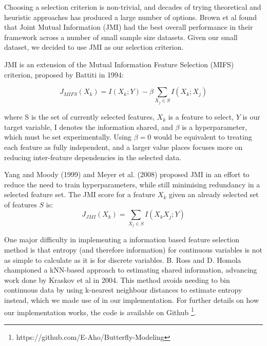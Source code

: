 \documentclass[prl,showpacs,superscriptaddress,twocolumn,longbibliography]{revtex4-1}
\begin{document}
Choosing a selection criterion is non-trivial, and decades of trying theoretical and heuristic approaches has produced a large number of options. Brown et al\cite{Brown2012} found that Joint Mutual Information (JMI)\cite{yang_data_2012} had the best overall performance in their framework across a number of small sample size datasets. Given our small dataset, we decided to use JMI as our selection criterion.

JMI is an extension of the Mutual Information Feature Selection (MIFS) criterion, proposed by Battiti in 1994:

\[ 
    J_{MIFS}(X_k) = I(X_k;Y) - \beta \sum_{X_j\in S} I(X_k;X_j)
\]

where S is the set of currently selected features, $X_k$ is a feature to select, $Y$ is our target variable, I denotes the information shared,  and $ \beta $ is a hyperparameter, which must be set experimentally. Using $\beta  = 0 $ would be equivalent to treating each feature as fully independent, and a larger value places focuses more on reducing inter-feature dependencies in the selected data. 

Yang and Moody (1999) and Meyer et al. (2008) proposed JMI in an effort to reduce the need to train hyperparameters, while still minimising redundancy in a selected feature set\cite{Brown2012}. The JMI score for a feature $X_k$ given an already selected set of features $S$ is:
\[ 
    J_{JMI}(X_k) =  \sum_{X_j\in S} I(X_kX_j;Y)
\]

One major difficulty in implementing a information based feature selection method is that entropy (and therefore information) for continuous variables is not as simple to calculate as it is for discrete variables. B. Ross\cite{Ross2014} and D. Homola \cite{Homola2016} championed a kNN-based approach to estimating shared information, advancing work done by Kraskov et al in 2004\cite{kraskov_estimating_2004}. This method avoids needing to bin continuous data by using k-nearest neighbour distances to estimate entropy instead, which we made use of in our implementation. For further details on how our implementation works, the code is available on Github \footnote{https://github.com/E-Aho/Butterfly-Modeling}.
\end{document}
